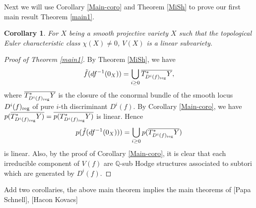 \documentclass[a4paper,12pt,reqno]{amsart}
\theoremstyle{plain}
\newtheorem{corollary}[theorem]{Corollary}
\theoremstyle{definition}
\newtheorem{lemma}[theorem]{Lemma}
\theoremstyle{remark}
\newcommand{\Q}{\mathbb Q}
\begin{document}
Next we will use Corollary \ref{Main-coro} and Theorem \ref{MiSh} to prove our first main result Theorem \ref{main1}.
\begin{corollary}\label{ECNT}
For $X$ being a smooth projective variety $X$ such that the topological Euler characteristic class $\chi(X)\not=0$, $V(X)$ is a linear subvariety.
\end{corollary}

\begin{proof}[Proof of Theorem \ref{main1}]
By Theorem \ref{MiSh}, we have $$\tilde{f}(df^{-1}(0_X))=\bigcup_{i\geq0}\overline{T^*_{D^i(f)_{\textnormal{reg}}}Y},$$ where $\overline{T^*_{D^i(f)_{\textnormal{reg}}}Y}$ is the closure of the conormal bundle of the smooth locus $D^i(f)_{\textnormal{reg}}$ of pure $i$-th discriminant $D^i(f)$. By Corollary \ref{Main-coro}, we have $p(\overline{T^*_{D^i(f)_{\textnormal{reg}}}Y)}=\overline{p(T^*_{D^i(f)_{\textnormal{reg}}}Y)}$ is linear. Hence $$p(\tilde{f}(df^{-1}(0_X)))=\bigcup_{i\geq0}p(\overline{T^*_{D^i(f)_{\textnormal{reg}}}Y})$$ is linear. Also, by the proof of Corollary \ref{Main-coro}, it is clear that each irreducible component of $V(f)$ are $\Q$-sub Hodge structures associated to subtori which are generated by $D^i(f)$.
\end{proof}




{\color{red} Add two corollaries, the above main theorem implies the main theorems of [Papa Schnell], [Hacon Kovacs]}







\end{document}
